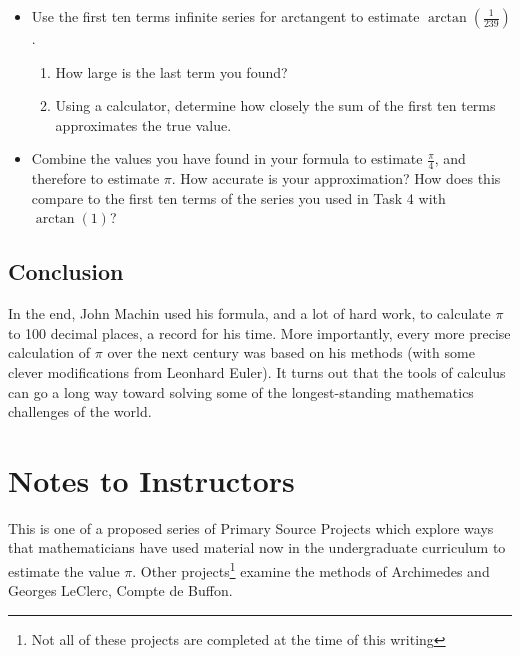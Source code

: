 \documentclass[11pt]{article}
\newcounter{tasknumb}
\newcommand{\tasknumb}{\stepcounter{tasknumb}\textmd{\textbf{$\fbox{$\fbox{Task \thetasknumb}$}$}}}
\newenvironment{task}%
 {\begin{itemize}
 \item[\tasknumb]  }
{
    \end{itemize}    }%
\begin{document}
\begin{task}
Use the first ten terms infinite series for arctangent to estimate $\arctan (\frac{1}{239})$.
\begin{enumerate}
\item[a.] How large is the last term you found?
\item[b.] Using a calculator, determine how closely the sum of the first ten terms approximates the true value.
\end{enumerate}
\end{task}

\begin{task}
Combine the values you have found in your formula to estimate $\frac{\pi}{4}$, and therefore to estimate $\pi$.  How accurate is your approximation?  How does this compare to the first ten terms of the series you used in Task 4 with $\arctan(1)$?
\end{task}

\subsection*{Conclusion}

In the end, John Machin used his formula, and a lot of hard work, to calculate $\pi$ to 100 decimal places, a record for his time. More importantly, every more precise calculation of $\pi$ over the next century was based on his methods (with some clever modifications from Leonhard Euler).  It turns out that the tools of calculus can go a long way toward solving some of the longest-standing mathematics challenges of the world.


{}


\newpage


\section*{Notes to Instructors}


This is one of a proposed series of Primary Source Projects which explore ways that mathematicians have used material now in the undergraduate curriculum to estimate the value $\pi$. Other projects\footnote{Not all of these projects are completed at the time of this writing} examine the methods of Archimedes and Georges LeClerc, Compte de Buffon.
\end{document}
